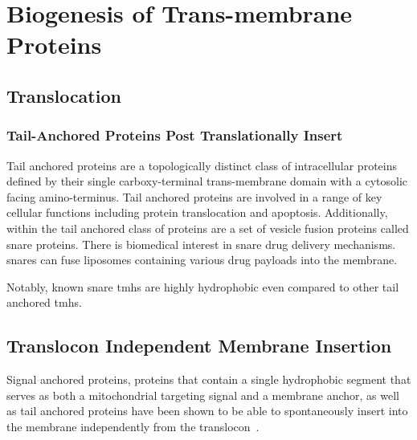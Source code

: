 \section{Biogenesis of Trans-membrane Proteins}
\subsection{Translocation}


\subsubsection{Tail-Anchored Proteins Post Translationally Insert}

Tail anchored proteins are a topologically distinct class of intracellular proteins defined by their single carboxy-terminal trans-membrane domain with a cytosolic facing amino-terminus. Tail anchored proteins are involved in a range of key cellular functions including protein translocation and apoptosis. Additionally, within the tail anchored class of proteins are a set of vesicle fusion proteins called \gls{snare} proteins. There is biomedical interest in \gls{snare} drug delivery mechanisms. \gls{snare}s can fuse liposomes containing various drug payloads into the membrane.

Notably, known \gls{snare} \gls{tmh}s are highly hydrophobic even compared to other tail anchored \gls{tmh}s.

\subsection{Translocon Independent Membrane Insertion}
Signal anchored proteins, proteins that contain a single hydrophobic segment that serves as both a mitochondrial targeting signal and a membrane anchor, as well as tail anchored proteins have been shown to be able to spontaneously insert into the membrane independently from the translocon~\cite{Elisa2012, Lan2000, Colombo2009}.

